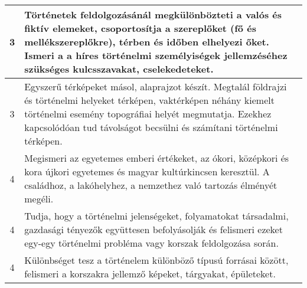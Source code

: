 \begin{longtable}{c | p{12cm} }
                                
                                          3 &  Történetek feldolgozásánál megkülönbözteti a valós és fiktív elemeket, csoportosítja a szereplőket (fő és mellékszereplőkre), térben és időben elhelyezi őket. Ismeri a a híres történelmi személyiségek jellemzéséhez szükséges kulcsszavakat, cselekedeteket. \\ \hline
                                          3 &  Egyszerű térképeket másol, alaprajzot készít. Megtalál földrajzi és történelmi helyeket térképen, vaktérképen néhány kiemelt történelmi esemény topográfiai helyét megmutatja. Ezekhez kapcsolódóan tud távolságot becsülni és számítani történelmi térképen. \\ \hline
                                      
                                
                                          4 &  Megismeri az egyetemes emberi értékeket, az ókori, középkori és kora újkori egyetemes és magyar kultúrkincsen keresztül. A családhoz, a lakóhelyhez, a nemzethez való tartozás élményét megéli. \\ \hline
                                          4 &  Tudja, hogy a történelmi jelenségeket, folyamatokat társadalmi, gazdasági tényezők együttesen befolyásolják és felismeri ezeket egy-egy történelmi probléma vagy korszak feldolgozása során. \\ \hline
                                          4 &  Különbséget tesz a történelem különböző típusú forrásai között, felismeri a korszakra jellemző képeket, tárgyakat, épületeket. \\ \hline
                                      
                        \end{longtable}
            \clearpage

